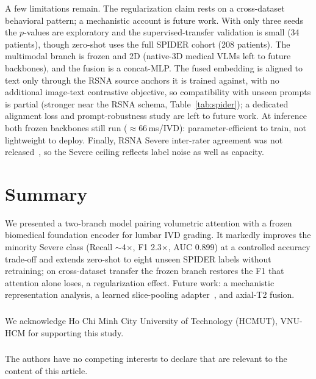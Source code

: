 \documentclass[runningheads]{llncs}
\begin{document}
A few limitations remain. The regularization claim rests on a cross-dataset behavioral pattern; a mechanistic account is future work. With only three seeds the $p$-values are exploratory and the supervised-transfer validation is small (34 patients), though zero-shot uses the full SPIDER cohort (208 patients). The multimodal branch is frozen and 2D (native-3D medical VLMs left to future backbones), and the fusion is a concat-MLP. The fused embedding is aligned to text only through the RSNA source anchors it is trained against, with no additional image-text contrastive objective, so compatibility with unseen prompts is partial (stronger near the RSNA schema, Table~\ref{tab:spider}); a dedicated alignment loss and prompt-robustness study are left to future work. At inference both frozen backbones still run ($\approx$66\,ms/IVD): parameter-efficient to train, not lightweight to deploy. Finally, RSNA Severe inter-rater agreement was not released~\cite{kaggle2024}, so the Severe ceiling reflects label noise as well as capacity.

\section{Summary}\label{sec5}

We presented a two-branch model pairing volumetric attention with a frozen biomedical foundation encoder for lumbar IVD grading. It markedly improves the minority Severe class (Recall $\sim$4$\times$, F1 2.3$\times$, AUC 0.899) at a controlled accuracy trade-off and extends zero-shot to eight unseen SPIDER labels without retraining; on cross-dataset transfer the frozen branch restores the F1 that attention alone loses, a regularization effect. Future work: a mechanistic representation analysis, a learned slice-pooling adapter~\cite{lu2024radclip}, and axial-T2 fusion.

\begin{credits}
\subsubsection{\ackname} We acknowledge Ho Chi Minh City University of Technology (HCMUT), VNU-HCM for supporting this study.
\subsubsection{\discintname} The authors have no competing interests to declare that are relevant to the content of this article.
\end{credits}
%


\end{document}
